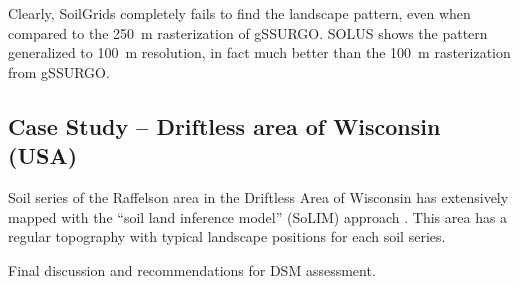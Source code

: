 \documentclass[soil, manuscript]{copernicus}
\begin{document}
\par
Clearly, SoilGrids completely fails to find the landscape pattern, even when compared to the 250~m rasterization of gSSURGO.
%
SOLUS shows the pattern generalized to 100~m resolution, in fact much better than the 100~m rasterization from gSSURGO.


\subsection{Case Study -- Driftless area of Wisconsin (USA)}

Soil series of the Raffelson  area in the Driftless Area of Wisconsin has extensively mapped with the ``soil land inference model'' (SoLIM) approach \citep{Zhu.etal2001,zhuPredictionSoilProperties2010}.
%
This area has a regular topography with typical landscape positions for each soil series.




\conclusions[Discussion]  %
%
Final discussion and recommendations for DSM assessment.










\end{document}
